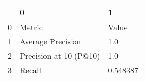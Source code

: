 \begin{tabular}{lll}
\toprule
{} &                       0 &         1 \\
\midrule
0 &                  Metric &     Value \\
1 &       Average Precision &       1.0 \\
2 &  Precision at 10 (P@10) &       1.0 \\
3 &                  Recall &  0.548387 \\
\bottomrule
\end{tabular}
